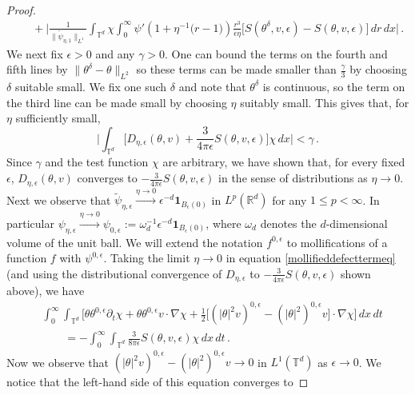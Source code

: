 \documentclass[11pt,reqno]{amsart}
\theoremstyle{definition}
\numberwithin{equation}{section}
\begin{document}
\begin{proof}
\begin{align}
&\quad+ \bigg\lvert \frac{1}{\lVert \tilde{\psi}_{\eta,1} \rVert_{L^1}} \int_{\mathbb{T}^d} \chi \int_0^\infty \psi' \left( 1 + \eta^{-1} \big( r - 1 \big) \right) \frac{r^3}{\epsilon \eta} \bigg[ S(\theta^\delta,v, \epsilon) - S(\theta,v, \epsilon) \bigg] \, dr \, dx \bigg\rvert \,.
\end{align}
We next fix $\epsilon > 0$ and any $\gamma>0$. One can bound the terms on the fourth and fifth lines by $\lVert \theta^\delta - \theta \rVert_{L^2}$ so these terms can be made smaller than $\frac{\gamma}{3}$ by choosing $\delta$ suitable small. We fix one such $\delta$ and note that $\theta^\delta$ is continuous, so the term on the third line can be made small by choosing $\eta$ suitably small. This gives that, for $\eta$ sufficiently small, 
\[
\bigg\lvert \int_{\mathbb{T}^d} \big[ D_{\eta,\epsilon} (\theta,v) + \frac{3}{4 \pi \epsilon} S(\theta,v, \epsilon) \big] \chi \, dx \bigg\rvert < \gamma\, .
\]
Since $\gamma$ and the test function $\chi$ are arbitrary, we have shown that, for every fixed $\epsilon$, $D_{\eta,\epsilon} (\theta, v)$ converges to $-\frac{3}{4 \pi \epsilon} S(\theta,v, \epsilon)$ in the sense of distributions as $\eta\to 0$. 
Next we observe that $\tilde{\psi}_{\eta,\epsilon} \xrightarrow[]{\eta \rightarrow 0} \epsilon^{-d} \mathbf{1}_{B_\epsilon (0)}$ in $L^p (\mathbb{R}^d)$ for any $1 \leq p < \infty$. In particular $\psi_{\eta, \epsilon}  \xrightarrow[]{\eta \rightarrow 0} \psi_{0, \epsilon} := \omega_d^{-1} \epsilon^{-d} \mathbf{1}_{B_\epsilon (0)}$, where $\omega_d$ denotes the $d$-dimensional volume of the unit ball. We will extend the notation $f^{0,\epsilon}$ to mollifications of a function $f$ with $\psi^{0,\epsilon}$. Taking the limit $\eta \rightarrow 0$ in equation \eqref{mollifieddefecttermeq} (and using the distributional convergence of $D_{\eta,\epsilon}$ to $- \frac{3}{4 \pi \epsilon} S(\theta, v, \epsilon)$ shown above), we have
\begin{align}
&\int_0^\infty \int_{\mathbb T^d} \bigg[ \theta \theta^{0,\epsilon} \partial_t \chi + \theta \theta^{0,\epsilon} v \cdot \nabla \chi + \frac{1}{2} \big[(\lvert \theta \rvert^2 v)^{0,\epsilon} - (\lvert \theta \rvert^2)^{0,\epsilon} v \big] \cdot \nabla \chi  \bigg] \, dx \, dt \nonumber \\
&\qquad = - \int_0^\infty \int_{\mathbb T^d} \frac{3}{8 \pi \epsilon} S(\theta,v, \epsilon) \chi \, dx \, dt \, . \label{mollifiedenergybalance}
\end{align}
Now we observe that $(\lvert \theta \rvert^2 v)^{0,\epsilon} - (\lvert \theta \rvert^2)^{0,\epsilon} v \rightarrow 0$ in $L^1 (\mathbb{T}^d)$ as $\epsilon \rightarrow 0$. We notice that the left-hand side of this equation converges to

\end{proof}
\end{document}
